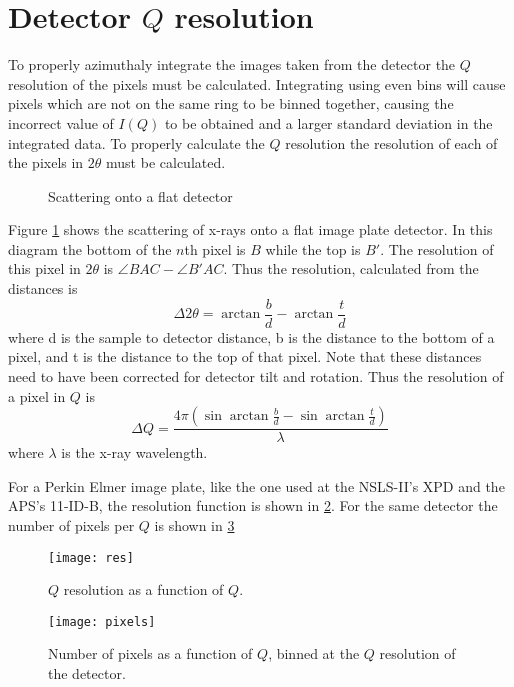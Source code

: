 \section{Detector $Q$ resolution} \label{subsec:qres}
To properly azimuthaly integrate the images taken from the detector the $Q$ resolution of the pixels must be calculated.
Integrating using even bins will cause pixels which are not on the same ring to be binned together, causing the incorrect value of $I(Q)$ to be obtained and a larger standard deviation in the integrated data.
To properly calculate the $Q$ resolution the resolution of each of the pixels in $2\theta$ must be calculated.
\begin{figure}
    \centering
    \caption{Scattering onto a flat detector}
    \label{fig:scattering_digram}
\end{figure}
Figure \ref{fig:scattering_digram} shows the scattering of x-rays onto a flat image plate detector.
In this diagram the bottom of the $n$th pixel is $B$ while the top is $B'$.
The resolution of this pixel in $2\theta$ is $\angle BAC - \angle B'AC$.
Thus the resolution, calculated from the distances is
\begin{equation}
\Delta 2 \theta = \arctan{\frac{b}{d}} - \arctan{\frac{t}{d}}
\end{equation}
where d is the sample to detector distance, b is the distance to the bottom of a pixel, and t is the distance to the top of that pixel.
Note that these distances need to have been corrected for detector tilt and rotation.
Thus the resolution of a pixel in $Q$ is
\begin{equation}
\Delta Q = \frac{4\pi(\sin{\arctan{\frac{b}{d}}} - \sin{\arctan{\frac{t}{d}}})}{\lambda}
\end{equation}
where $\lambda$ is the x-ray wavelength.

For a Perkin Elmer image plate, like the one used at the NSLS-II's XPD and the APS's 11-ID-B, the resolution function is shown in \ref{fig:res_func}.
For the same detector the number of pixels per $Q$ is shown in \ref{fig:pixel_hist}
\begin{figure}[!ht]
  \texttt{[image: res]}
\caption{$Q$ resolution as a function of $Q$.}
\label{fig:res_func}
\end{figure}

\begin{figure}[!ht]
  \texttt{[image: pixels]}
\caption{Number of pixels as a function of $Q$, binned at the $Q$ resolution of the detector.}
\label{fig:pixel_hist}
\end{figure}